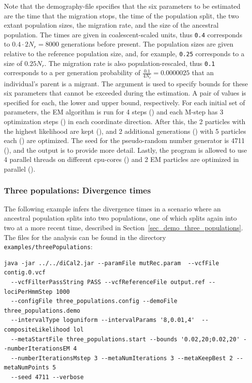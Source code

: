 \documentclass{article}
\numberwithin{equation}{section}
\begin{document}
Note that the demography-file specifies that the six parameters to be estimated are the time that the migration stops, the time of the population split, the two extant population sizes, the migration rate, and the size of the ancestral population. The times are given in coalescent-scaled units, thus \texttt{0.4} corresponds to $0.4 \cdot 2 N_r = 8000$ generations before present. The population sizes are given relative to the reference population size, and, for example, \texttt{0.25} corresponds to a size of $0.25 N_r$. The migration rate is also population-rescaled, thus \texttt{0.1} corresponds to a per generation probability of $\frac{0.1}{4 N_r} = 0.0000025$ that an individual's parent is a migrant. The argument  is used to specify bounds for these six parameters that cannot be exceeded during the estimation. A pair of values is specified for each, the lower and upper bound, respectively. For each initial set of parameters, the EM algorithm is run for 4 steps () and each M-step has 3 optimization steps () in each coordinate direction. After this, the 2 particles  with the highest likelihood are kept (), and 2 additional generations () with 5 particles each () are optimized. The seed for the pseudo-random number generator is 4711 (), and the output is  to provide more detail. Lastly, the program is allowed to use 4 parallel threads on different cpu-cores () and 2 EM particles are optimized in parallel ().

\subsubsection{Three populations: Divergence times}
\label{sec_examples_three_populations}

The following example infers the divergence times in a scenario where an ancestral population splits into two populations, one of which splits again into two at a more recent time, described in Section~\ref{sec_demo_three_populations}. The files for the analysis can be found in the directory \texttt{examples/threePopulations}:

\begin{verbatim}
java -jar ../../diCal2.jar --paramFile mutRec.param  --vcfFile contig.0.vcf
  --vcfFilterPassString PASS --vcfReferenceFile output.ref --lociPerHmmStep 1000
  --configFile three_populations.config --demoFile three_populations.demo
  --intervalType loguniform --intervalParams '8,0.01,4'  --compositeLikelihood lol
  --metaStartFile three_populations.start --bounds '0.02,20;0.02,20' --numberIterationsEM 4
  --numberIterationsMstep 3 --metaNumIterations 3 --metaKeepBest 2 --metaNumPoints 5
  --seed 4711 --verbose
\end{verbatim}
\end{document}
